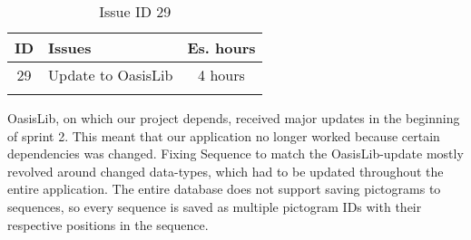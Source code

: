 \begin{longtable} { | c | p{12cm} | c | } 
\hline
	ID 	&	Issues	&		 Es. hours \\\hline
	29 	&	Update to OasisLib	&	4 hours \\\hline
\caption{Issue ID 29}
\label{tab:spr2_oasislib}
\end{longtable}

OasisLib, on which our project depends, received major updates in the beginning of sprint 2. This meant that our application no longer worked because certain dependencies was changed. Fixing Sequence to match the OasisLib-update mostly revolved around changed data-types, which had to be updated throughout the entire application.
The entire database does not support saving pictograms to sequences, so every sequence is saved as multiple pictogram IDs with their respective positions in the sequence.